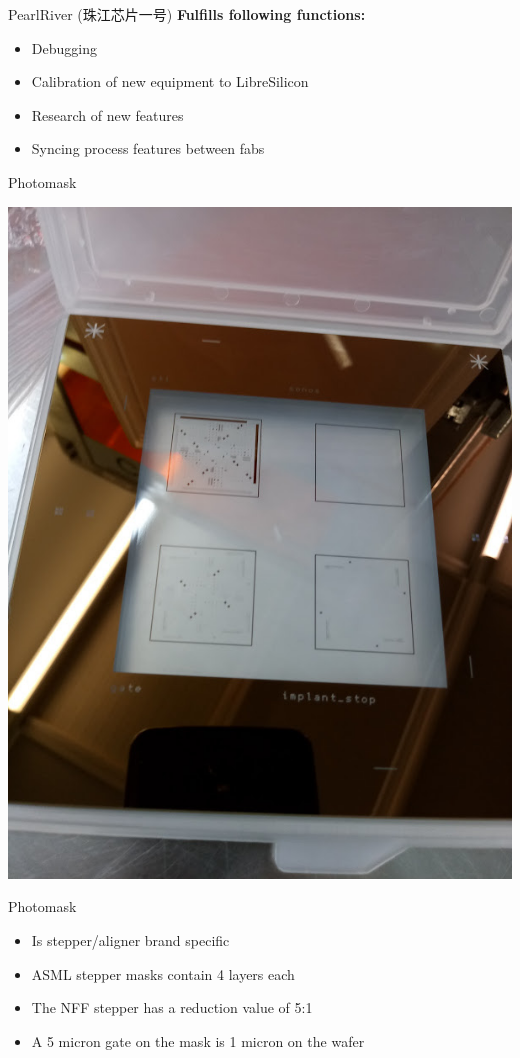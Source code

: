 \documentclass[aspectratio=169]{beamer}
\begin{document}
\begin{frame}{PearlRiver \cjkfont(珠江芯片一号)}
	\textbf{Fulfills following functions:}
	\begin{itemize}
		\item Debugging
		\item Calibration of new equipment to LibreSilicon
		\item Research of new features
		\item Syncing process features between fabs
	\end{itemize}
\end{frame}

\begin{frame}{Photomask}
\begin{center}
\includegraphics[height=0.8\textheight]{images/20181207_113845_Burst01.jpg}
\end{center}
\end{frame}

\begin{frame}{Photomask}
	\begin{itemize}
		\item Is stepper/aligner brand specific
		\item ASML stepper masks contain 4 layers each
		\item The NFF stepper has a reduction value of 5:1
		\item A 5 micron gate on the mask is 1 micron on the wafer
	\end{itemize}
\end{frame}
\end{document}
